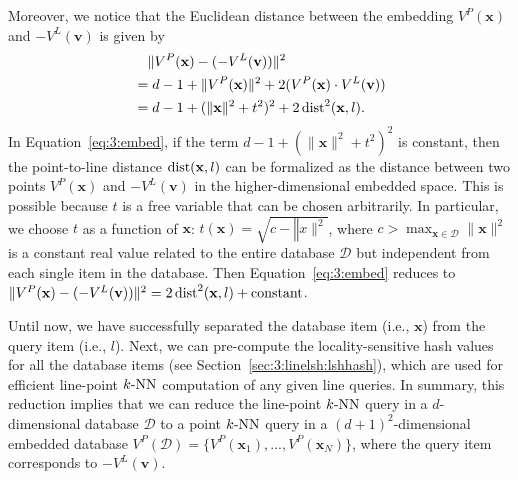 Moreover, we notice that the Euclidean distance between the embedding $V^P(\mathbf x)$ and $-V^L(\mathbf v)$ is given by
\begin{equation}
  \begin{aligned}
    \label{eq:3:embed}
    &\quad{} \|V^P(\mathbf x) - (- V^L(\mathbf v)) \|^2 \\
    &= d - 1 + \|V^P(\mathbf x)\|^2 + 2(V^P(\mathbf x) \cdot V^L(\mathbf v)) \\
    &= d - 1 + (\|\mathbf x\|^2 + t^2)^2 + 2\operatorname{dist}^2(\mathbf x, l).
  \end{aligned}
\end{equation}
In Equation~\ref{eq:3:embed}, if the term $d - 1 + (\|\mathbf x\|^2 + t^2)^2$ is constant, then the point-to-line distance $\operatorname{dist}(\mathbf x, l)$ can be formalized as the distance between two points $V^P(\mathbf x)$ and $-V^L(\mathbf v)$ in the higher-dimensional embedded space. This is possible because $t$ is a free variable that can be chosen arbitrarily. In particular, we choose $t$ as a function of $\mathbf x$: $t(\mathbf x) = \sqrt{c - \mathbf \|x\|^2}$, where $c > \max_{\mathbf x \in \mathcal D}\|\mathbf x\|^2$ is a constant real value related to the entire database $\mathcal D$ but independent from each single item in the database. Then Equation~\ref{eq:3:embed} reduces to $\|V^P(\mathbf x) - (- V^L(\mathbf v)) \|^2 = 2 \operatorname{dist}^2(\mathbf x, l) + \text{constant}$.

Until now, we have successfully separated the database item (i.e., $\mathbf x$) from the query item (i.e., $l$). Next, we can pre-compute the locality-sensitive hash values for all the database items (see Section~\ref{sec:3:linelsh:lshhash}), which are used for efficient line-point $k\text{-NN}$ computation of any given line queries. In summary, this reduction implies that we can reduce the line-point $k\text{-NN}$ query in a $d$-dimensional database $\mathcal D$ to a point $k\text{-NN}$ query in a $(d+1)^2$-dimensional embedded database $V^P(\mathcal D) = \{V^P(\mathbf x_1), ..., V^P(\mathbf x_N) \}$, where the query item corresponds to $-V^L(\mathbf v)$.

